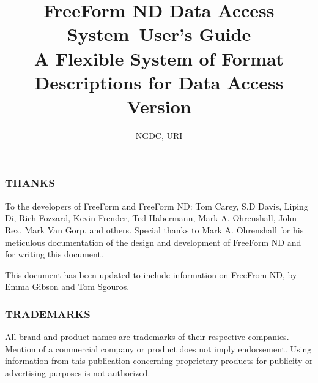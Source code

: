 \documentclass{dods-book}
\newcommand{\DOCversion}{Version \rcsInfoRevision}
\newcommand{\FFND}{FreeForm ND Data Access System}
\begin{document}
\title{\FFND\ User's Guide\\A Flexible System of Format Descriptions 
for Data Access\\\DOCversion}  
\author{NGDC, URI}
\maketitle

\W{}

\W

\subsubsection{THANKS}

To the developers of FreeForm and FreeForm ND: Tom Carey, S.D Davis,
Liping Di, Rich Fozzard, Kevin Frender, Ted Habermann, Mark A.
Ohrenshall, John Rex, Mark Van Gorp, and others. Special thanks to
Mark A. Ohrenshall for his meticulous documentation of the design and
development of FreeForm ND and for writing this document.

This document has been updated to include information on FreeFrom ND,
by Emma Gibson and Tom Sgouros.

\subsubsection{TRADEMARKS}

All brand and product names are trademarks of their respective
companies. Mention of a commercial company or product does not imply
endorsement. Using information from this publication concerning
proprietary products for publicity or advertising purposes is not
authorized.

\T

\tableofcontents
\listoftables

\clearemptydoublepage





\end{document}
